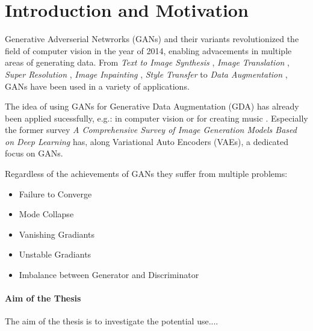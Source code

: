 \section{Introduction and Motivation}\label{introduction_and_motivation}
\pagestyle{fancy}
Generative Adverserial Netwrorks (GANs) \cite{goodfellow2014generativeadversarialnetworks} and their variants revolutionized the field of computer vision in the year of 2014, enabling advacements in multiple areas of generating data. From \textit{Text to Image Synthesis} \cite{reed2016generativeadversarialtextimage}, \textit{Image Translation} \cite{isola2018imagetoimagetranslationconditionaladversarial}, \textit{Super Resolution} \cite{ledig2017photorealisticsingleimagesuperresolution}, \textit{Image Inpainting} \cite{pathak2016contextencodersfeaturelearning}, \textit{Style Transfer} \cite{wang2023multimodalityguidedimagestyletransfer} to \textit{Data Augmentation} \cite{shorten2019survey}, GANs have been used in a variety of applications.

The idea of using GANs for Generative Data Augmentation (GDA) has already been applied sucessfully, e.g.: in computer vision \cite{Li2025comprehensivesurvedeepimages} or for creating music \cite{ji2020comprehensivesurveydeepmusic}. Especially the former survey \textit{A Comprehensive Survey of Image Generation Models Based on Deep Learning} has, along Variational Auto Encoders (VAEs), a dedicated focus on GANs.

Regardless of the achievements of GANs they suffer from multiple problems:

\begin{itemize}
    \item Failure to Converge
    \item Mode Collapse
    \item Vanishing Gradiants
    \item Unstable Gradiants
    \item Imbalance between Generator and Discriminator
\end{itemize}


\paragraph{Aim of the Thesis}\label{aim_of_the_thesis}
The aim of the thesis is to investigate the potential use....


\newpage
